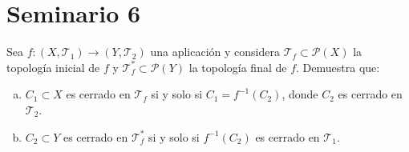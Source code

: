 \section{Seminario 6}
\begin{ejer}
    [95] Sea $f : (X, \mathcal{T}_1) \to (Y, \mathcal{T}_2)$ una aplicación y considera $\mathcal{T}_f \subset \mathcal{P}(X)$ la topología inicial de $f$ y $\mathcal{T}_f^* \subset \mathcal{P}(Y)$ la topología final de $f$. Demuestra que:
    \begin{enumerate}[a)]
        \item $C_1 \subset X$ es cerrado en $\mathcal{T}_f$ si y solo si $C_1 = f^{-1}(C_2)$, donde $C_2$ es cerrado en $\mathcal{T}_2$.
        \item $C_2 \subset Y$ es cerrado en $\mathcal{T}_f^*$ si y solo si $f^{-1}(C_2)$ es cerrado en $\mathcal{T}_1$.
    \end{enumerate}
\end{ejer}

